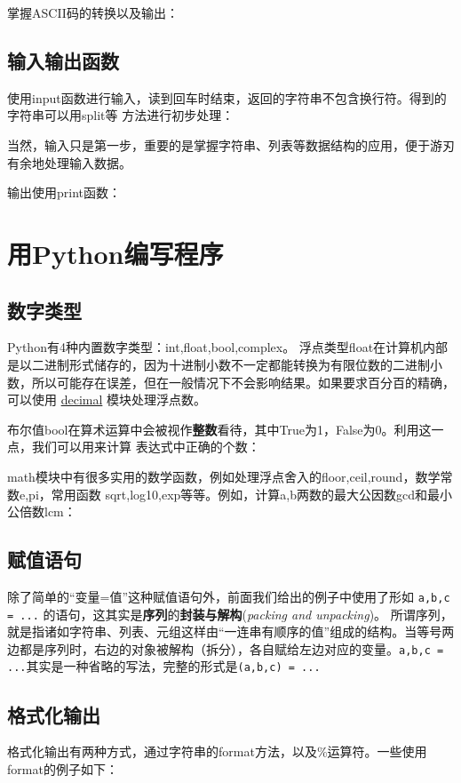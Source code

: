 \documentclass{style/ucasproposal}
\newcommand{\inlinepython}[1]{\texttt{#1}}
\begin{document}
掌握ASCII码的转换以及输出：

\subsection{输入输出函数}
使用input函数进行输入，读到回车时结束，返回的字符串不包含换行符。得到的字符串可以用split等
方法进行初步处理：

当然，输入只是第一步，重要的是掌握字符串、列表等数据结构的应用，便于游刃有余地处理输入数据。

输出使用print函数：

\section{用Python编写程序}
\subsection{数字类型}
Python有4种内置数字类型：int,float,bool,complex。
浮点类型float在计算机内部是以二进制形式储存的，因为十进制小数不一定都能转换为有限位数的二进制小数，所以可能存在误差，但在一般情况下不会影响结果。如果要求百分百的精确，可以使用
\href{https://finthon.com/python-decimal/}{decimal} 模块处理浮点数。

布尔值bool在算术运算中会被视作\textbf{整数}看待，其中True为1，False为0。利用这一点，我们可以用来计算
表达式中正确的个数：

math模块中有很多实用的数学函数，例如处理浮点舍入的floor,ceil,round，数学常数e,pi，常用函数
sqrt,log10,exp等等。例如，计算a,b两数的最大公因数gcd和最小公倍数lcm：

\subsection{赋值语句}
除了简单的``变量=值''这种赋值语句外，前面我们给出的例子中使用了形如
\inlinepython{a,b,c = ...} 的语句，这其实是\textbf{序列}的\textbf{封装与解构}(\textit{packing and unpacking})。
所谓序列，就是指诸如字符串、列表、元组这样由``一连串有顺序的值''组成的结构。当等号两边都是序列时，右边的对象被解构（拆分），各自赋给左边对应的变量。\inlinepython{a,b,c = ...}其实是一种省略的写法，完整的形式是\inlinepython{(a,b,c) = ...}

\subsection{格式化输出}
格式化输出有两种方式，通过字符串的format方法，以及\%运算符。一些使用format的例子如下：
\end{document}
